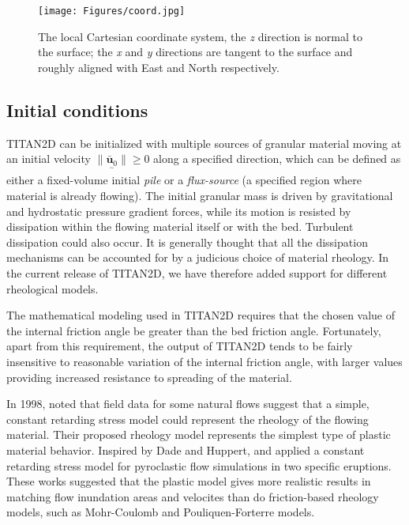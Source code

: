 \begin{figure}[H]
        \centering
        \texttt{[image: Figures/coord.jpg]}
        \caption{The local Cartesian coordinate system, the \textit{z} direction is normal to the
surface; the \textit{x} and \textit{y} directions are tangent to the surface and roughly aligned
with East and North respectively.}
        \label{coordinate}
\end{figure}




\subsection{Initial conditions}\label{IC}

TITAN2D can be initialized with multiple sources of granular material moving at an initial velocity $\|\underset{^\sim}{\bar{\textbf{u}}_0}\| \geq 0$ along a specified direction, which can be defined as either a fixed-volume initial \emph{pile} or a \emph{flux-source} (a specified region where material is already flowing). The initial granular mass is driven by gravitational and hydrostatic pressure gradient forces, while its motion is resisted by dissipation within the flowing material itself or with the bed.   Turbulent dissipation  could also occur.  It is generally thought that all the dissipation mechanisms can be accounted for by a judicious choice of material rheology. In the current release of TITAN2D, we have therefore added support for different rheological models.



The mathematical modeling used in TITAN2D requires that the chosen value of the internal friction angle be greater than the bed friction angle. Fortunately, apart from this requirement, the output of TITAN2D tends to be fairly insensitive to reasonable variation of the internal friction angle, with larger values providing increased resistance to spreading of the material.







In 1998, \cite{DadeHuppert1998} noted that field data for some  natural flows suggest that a simple, constant retarding stress model could represent the rheology of the flowing material. Their proposed rheology model represents the simplest type of  plastic material behavior. Inspired by Dade and Huppert, \cite{Kelfoun2005} and \cite{Kelfoun2009} applied a constant retarding stress model for pyroclastic flow simulations in two specific eruptions. These works suggested that the plastic model gives more realistic results in matching flow inundation areas and velocites than do friction-based rheology models, such as Mohr-Coulomb and Pouliquen-Forterre models.

